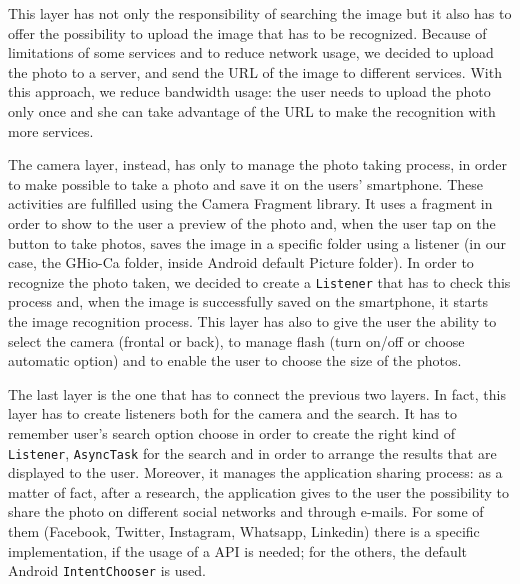 This layer has not only the responsibility of searching the image but it also has to offer
the possibility to upload the image that has to be recognized. Because of
limitations of some services and to reduce network usage, we decided to upload 
the photo to a server, and send the URL of the image to different services.
With this approach, we reduce bandwidth usage: the user needs to upload the
photo only once and she can take advantage of the URL to make the recognition with
more services.

The camera layer, instead, has only to manage the photo taking process, in order
to make possible to take a photo and save it on the users' smartphone. These
activities are fulfilled using the Camera Fragment library. It uses a fragment
in order to show to the user a preview of the photo and, when the user tap on
the button to take photos, saves the image in a specific folder using a
listener (in our case, the GHio-Ca folder, inside Android default Picture
folder). In order to recognize the photo taken, we decided to create a
\texttt{Listener} that has to check this process and, when the image is 
successfully saved on the smartphone, it starts the image recognition process.
This layer has also to give the user the ability to select the camera (frontal
or back), to manage flash (turn on/off or choose automatic option) and to enable
the user to choose the size of the photos.

The last layer is the one that has to connect the previous two layers. In fact,
this layer has to create listeners both for the camera and the search. It has
to remember user's search option choose in order to create the right kind of
\texttt{Listener}, \texttt{AsyncTask} for the search and in order to arrange the 
results that are displayed to the user. Moreover, it manages the application
sharing process: as a matter of fact, after a research, the application gives 
to the user the possibility to share the photo on different social networks and
through e-mails. For some of them (Facebook, Twitter, Instagram, Whatsapp,
Linkedin) there is a specific implementation, if the usage of a API is needed;
for the others, the default Android \texttt{IntentChooser} is used.
